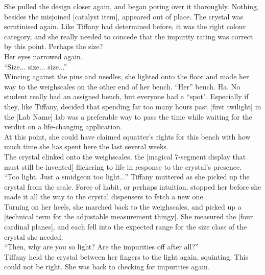 She pulled the design closer again, and began poring over it thoroughly.
Nothing, besides the misjoined [catalyst item], appeared out of place.
The crystal was scrutinised again.
Like Tiffany had determined before, it was the right colour category, and she really needed to concede that the impurity rating was correct by this point.
Perhaps the size?\\

Her eyes narrowed again.\\

``Size... size... size...''\\

Wincing against the pins and needles, she lighted onto the floor and made her way to the weighscales on the other end of her bench. 
``Her'' bench. Ha.
No student really had an assigned bench, but everyone had a ``spot".
Especially if they, like Tiffany, decided that spending far too many hours past [first twilight] in the [Lab Name] lab was a preferable way to pass the time while waiting for the verdict on a life-changing application.\\

At this point, she could have claimed squatter's rights for this bench with how much time she has spent here the last several weeks.\\

The crystal clinked onto the weighscales, the [magical 7-segment display that must still be invented] flickering to life in response to the crystal's presence.\\

``Too light. Just a smidgeon too light...'' Tiffany muttered as she picked up the crystal from the scale. 
Force of habit, or perhaps intuition, stopped her before she made it all the way to the crystal dispensers to fetch a new one.\\

Turning on her heels, she marched back to the weighscales, and picked up a [technical term for the adjustable measurement thingy]. 
She measured the [four cardinal planes], and each fell into the expected range for the size class of the crystal she needed.\\

``Then, why are you so light? Are the impurities off after all?''\\

Tiffany held the crystal between her fingers to the light again, squinting.
This could not be right.
She was back to checking for impurities again.\\

